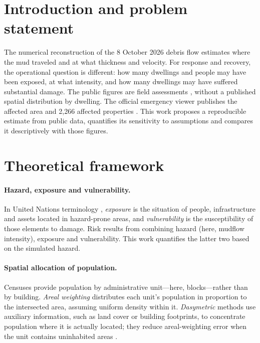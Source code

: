 \documentclass[10pt,a4paper]{article}
\begin{document}
\section{Introduction and problem statement}
The numerical reconstruction of the 8 October 2026 debris flow \citep{wood2026} estimates where the mud traveled and at what thickness and velocity. For response and recovery, the operational question is different: how many dwellings and people may have been exposed, at what intensity, and how many dwellings may have suffered substantial damage. The public figures are field assessments \citep{senapred2026latribuna,cnn2026balance,latercera2026senapred}, without a published spatial distribution by dwelling. The official emergency viewer publishes the affected area and 2,266 affected properties \citep{bbnn2026visor}. This work proposes a reproducible estimate from public data, quantifies its sensitivity to assumptions and compares it descriptively with those figures.

\section{Theoretical framework}
\paragraph{Hazard, exposure and vulnerability.} In United Nations terminology \citep{undrr2016}, \emph{exposure} is the situation of people, infrastructure and assets located in hazard-prone areas, and \emph{vulnerability} is the susceptibility of those elements to damage. Risk results from combining hazard (here, mudflow intensity), exposure and vulnerability. This work quantifies the latter two based on the simulated hazard.
\paragraph{Spatial allocation of population.} Censuses provide population by administrative unit---here, blocks---rather than by building. \emph{Areal weighting} distributes each unit's population in proportion to the intersected area, assuming uniform density within it. \emph{Dasymetric} methods use auxiliary information, such as land cover or building footprints, to concentrate population where it is actually located; they reduce areal-weighting error when the unit contains uninhabited areas \citep{eicher2001,mennis2003}.
\end{document}

